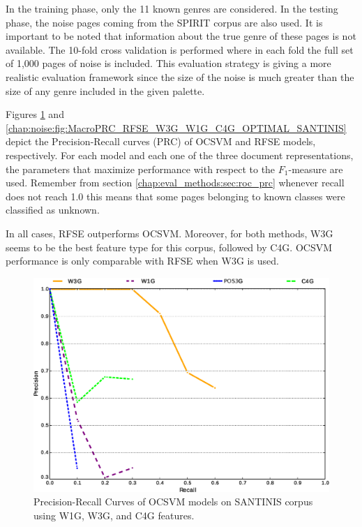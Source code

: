 In the training phase, only the 11 known genres are considered. In the testing phase, the noise pages coming from the SPIRIT corpus are also used. It is important to be noted that information about the true genre of these pages is not available. The 10-fold cross validation is performed where in each fold the full set of 1,000 pages of noise is included. This evaluation strategy is giving a more realistic evaluation framework since the size of the noise is much greater than the size of any genre included in the given palette.

Figures \ref{chap:noise:fig:MacroPRC_OCSVME_W3G_W1G_C4G_OPTIMAL_SANTINIS} and \ref{chap:noise:fig:MacroPRC_RFSE_W3G_W1G_C4G_OPTIMAL_SANTINIS} depict the Precision-Recall curves (PRC) of OCSVM and RFSE models, respectively. For each model and each one of the three document representations, the parameters that maximize performance with respect to the $F_{1}$-measure are used. Remember from section \ref{chap:eval_methods:sec:roc_prc} whenever recall does not reach 1.0 this means that some pages belonging to known classes were classified as unknown. 

In all cases, RFSE outperforms OCSVM. Moreover, for both methods, W3G seems to be the best feature type for this corpus, followed by C4G. OCSVM performance is only comparable with RFSE when W3G is used.

\hfill \break


\begin{figure}[H]
	\begin{center}
    \includegraphics[scale=0.45]{Figures/OCSME_Best_per_DocRep.eps}
	\caption{Precision-Recall Curves of OCSVM models on SANTINIS corpus using W1G, W3G, and C4G features.}
	\label{chap:noise:fig:MacroPRC_OCSVME_W3G_W1G_C4G_OPTIMAL_SANTINIS}
	\end{center}
\end{figure}

